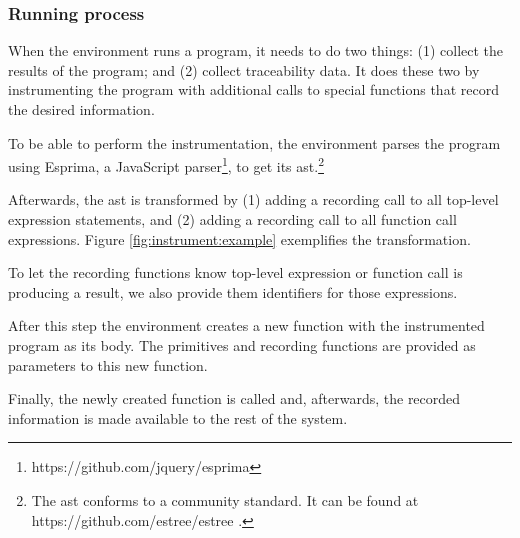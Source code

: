 %


\subsubsection{Running process}
When the environment runs a program, it needs to do two things: (1) collect the results of the program; and (2) collect traceability data.
It does these two by instrumenting the program with additional calls to special functions that record the desired information.

To be able to perform the instrumentation, the environment parses the program using Esprima, a JavaScript parser\footnote{https://github.com/jquery/esprima}, to get its \gls{ast}.\footnote{The \gls{ast} conforms to a community standard. It can be found at https://github.com/estree/estree .}

Afterwards, the \gls{ast} is transformed by (1) adding a recording call to all top-level expression statements, and (2) adding a recording call to all function call expressions.
Figure \ref{fig:instrument:example} exemplifies the transformation.

To let the recording functions know top-level expression or function call is producing a result, we also provide them identifiers for those expressions.

After this step the environment creates a new function with the instrumented program as its body.
The primitives and recording functions are provided as parameters to this new function.

Finally, the newly created function is called and, afterwards, the recorded information is made available to the rest of the system.

